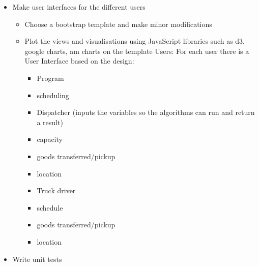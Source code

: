 \documentclass[paper=a4, fontsize=11pt]{scrartcl} %
\numberwithin{equation}{section} %
\numberwithin{figure}{section} %
\numberwithin{table}{section} %
\begin{document}
\begin{itemize}
	\item  Make user interfaces for the different users

		\begin{itemize}
		 \item Choose a bootstrap template and make minor modifications
		\item Plot the views and visualisations using JavaScript libraries such as d3, google charts, am charts on the template Users: For each user there is a User Interface based on the design:
		
		\begin{itemize}
		\item Program
		\item scheduling
		\item Dispatcher (inputs the variables so the algorithms can run and return a result)
		\item capacity
					\item goods transferred/pickup
					\item location
				\item Truck driver
					\item schedule
					\item goods transferred/pickup
					\item location
		\end{itemize}
		
		\end{itemize}
	\item Write unit tests 
\end{itemize}


\end{document}
